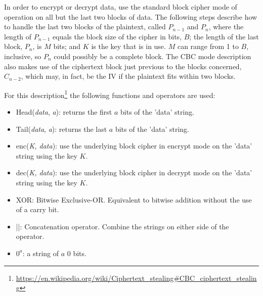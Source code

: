 In order to encrypt or decrypt data, use the standard block cipher mode of operation on all but the last two blocks of data.
The following steps describe how to handle the last two blocks of the plaintext, called \(P_{n-1}\) and \(P_n\), where the length of \(P_{n-1}\) equals the block size of the cipher in bits, \(B\); the length of the last block, \(P_n\), is \(M\) bits; and \(K\) is the key that is in use. \(M\) can range from 1 to \(B\), inclusive, so \(P_n\) could possibly be a complete block. The CBC mode description also makes use of the ciphertext block just previous to the blocks concerned, \(C_{n-2}\), which may, in fact, be the IV if the plaintext fits within two blocks.

For this description\footnote{\url{https://en.wikipedia.org/wiki/Ciphertext_stealing\#CBC_ciphertext_stealing}} the following functions and operators are used:

\begin{itemize}
    \item Head(\textit{data}, \textit{a}): returns the first \(a\) bits of the 'data' string.
    \item Tail(\textit{data}, \textit{a}): returns the last \(a\) bits of the 'data' string.
    \item enc(\textit{K, data}): use the underlying block cipher in encrypt mode on the 'data' string using the key \(K\).
    \item dec(\textit{K, data}): use the underlying block cipher in decrypt mode on the 'data' string using the key \(K\).
    \item XOR: Bitwise Exclusive-OR. Equivalent to bitwise addition without the use of a carry bit.
    \item ||: Concatenation operator. Combine the strings on either side of the operator.
    \item \(0^a\): a string of \(a\) 0 bits.
\end{itemize}



